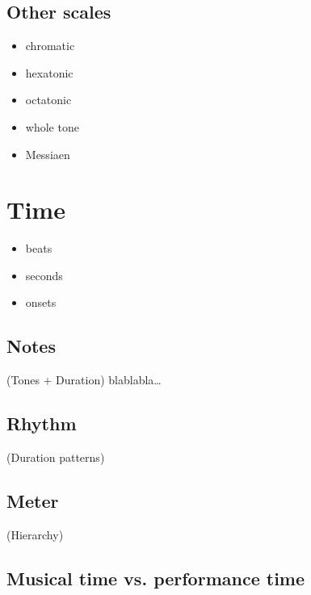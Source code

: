 \documentclass[letterpaper,10pt,english]{sphinxmanual}
\begin{document}
\subsection{Other scales}
\label{\detokenize{1_fundamentals:other-scales}}\begin{itemize}
\item {} 
chromatic

\item {} 
hexatonic

\item {} 
octatonic

\item {} 
whole tone

\item {} 
Messiaen

\end{itemize}


\section{Time}
\label{\detokenize{1_fundamentals:time}}\begin{itemize}
\item {} 
beats

\item {} 
seconds

\item {} 
onsets

\end{itemize}


\subsection{Notes}
\label{\detokenize{1_fundamentals:notes}}
(Tones + Duration)
blablabla…


\subsection{Rhythm}
\label{\detokenize{1_fundamentals:rhythm}}
(Duration patterns)


\subsection{Meter}
\label{\detokenize{1_fundamentals:meter}}
(Hierarchy)


\subsection{Musical time vs. performance time}
\label{\detokenize{1_fundamentals:musical-time-vs-performance-time}}
\end{document}
